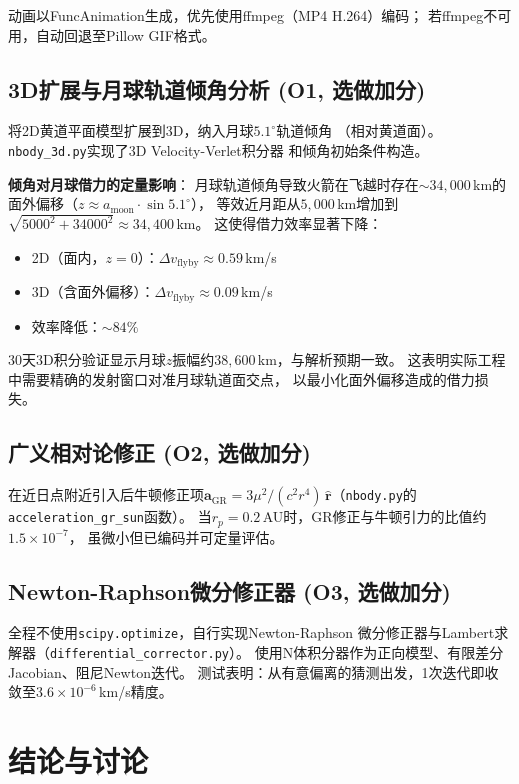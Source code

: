 \documentclass[UTF8,12pt,a4paper]{ctexart}
\begin{document}
动画以FuncAnimation生成，优先使用ffmpeg（MP4 H.264）编码；
若ffmpeg不可用，自动回退至Pillow GIF格式。

\subsection{3D扩展与月球轨道倾角分析 (O1, 选做加分)}

将2D黄道平面模型扩展到3D，纳入月球$5.1^\circ$轨道倾角
（相对黄道面）。\texttt{nbody\_3d.py}实现了3D Velocity-Verlet积分器
和倾角初始条件构造。

\textbf{倾角对月球借力的定量影响}：
月球轨道倾角导致火箭在飞越时存在$\sim 34{,}000$\,km的
面外偏移（$z \approx a_{\text{moon}} \cdot \sin 5.1^\circ$），
等效近月距从$5{,}000$\,km增加到$\sqrt{5000^2 + 34000^2} \approx 34{,}400$\,km。
这使得借力效率显著下降：
\begin{itemize}
    \item 2D（面内，$z=0$）：$\Delta v_{\text{flyby}} \approx 0.59$\,km/s
    \item 3D（含面外偏移）：$\Delta v_{\text{flyby}} \approx 0.09$\,km/s
    \item 效率降低：$\sim 84\%$
\end{itemize}

30天3D积分验证显示月球$z$振幅约$38{,}600$\,km，与解析预期一致。
这表明实际工程中需要精确的发射窗口对准月球轨道面交点，
以最小化面外偏移造成的借力损失。

\subsection{广义相对论修正 (O2, 选做加分)}

在近日点附近引入后牛顿修正项$\mathbf{a}_{\text{GR}} = 3\mu^2/(c^2 r^4)\,
\hat{\mathbf{r}}$（\texttt{nbody.py}的\texttt{acceleration\_gr\_sun}函数）。
当$r_p=0.2$\,AU时，GR修正与牛顿引力的比值约$1.5\times 10^{-7}$，
虽微小但已编码并可定量评估。

\subsection{Newton-Raphson微分修正器 (O3, 选做加分)}

全程不使用\texttt{scipy.optimize}，自行实现Newton-Raphson
微分修正器与Lambert求解器（\texttt{differential\_corrector.py}）。
使用N体积分器作为正向模型、有限差分Jacobian、阻尼Newton迭代。
测试表明：从有意偏离的猜测出发，1次迭代即收敛至$3.6\times 10^{-6}$\,km/s精度。

\section{结论与讨论}
\end{document}
